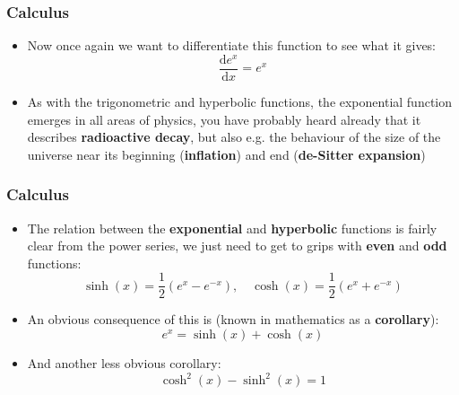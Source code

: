 \documentclass{beamer}
\begin{document}
\begin{frame}
  \frametitle{Calculus}
  \begin{itemize}
    \item<1-> Now once again we want to differentiate this function to see what it gives:
      \begin{equation*}
	\frac{\mathrm{d}e^x}{\mathrm{d}x}=e^x
      \end{equation*}
    \item<2-> As with the trigonometric and hyperbolic functions, the exponential function emerges in all areas of physics, you have probably heard already that it describes \textbf{radioactive decay}, but also e.g. the behaviour of the size of the universe near its beginning (\textbf{inflation}) and end (\textbf{de-Sitter expansion})
  \end{itemize}
\end{frame}

\begin{frame}
  \frametitle{Calculus}
  \begin{itemize}
    \item<1-> The relation between the \textbf{exponential} and \textbf{hyperbolic} functions is fairly clear from the power series, we just need to get to grips with \textbf{even} and \textbf{odd} functions:
      \begin{equation}
	\sinh(x)=\frac{1}{2}\left( e^x-e^{-x} \right), \quad \cosh(x)=\frac{1}{2}\left( e^x+e^{-x} \right)
	\label{<+label+>}
      \end{equation}
    \item<2-> An obvious consequence of this is (known in mathematics as a \textbf{corollary}):
      \begin{equation*}
	e^x=\sinh(x)+\cosh(x)	
      \end{equation*}
    \item<3-> And another less obvious corollary:
      \begin{equation*}
	\cosh^2(x)-\sinh^2(x)=1
      \end{equation*}
  \end{itemize}
\end{frame}
\end{document}
